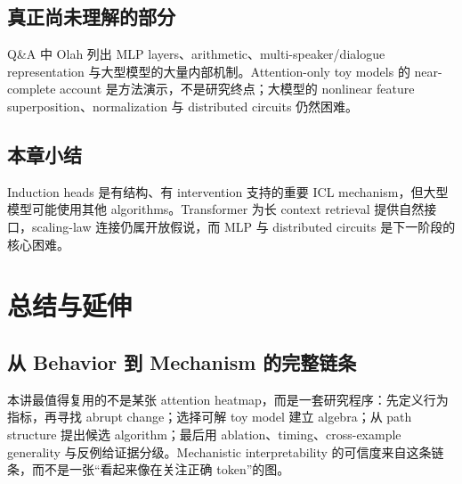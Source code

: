 \documentclass[a4paper]{article}
\begin{document}

\subsection{真正尚未理解的部分}

Q\&A 中 Olah 列出 MLP layers、arithmetic、multi-speaker/dialogue representation 与大型模型的大量内部机制。Attention-only toy models 的 near-complete account 是方法演示，不是研究终点；大模型的 nonlinear feature superposition、normalization 与 distributed circuits 仍然困难。


\subsection{本章小结}

Induction heads 是有结构、有 intervention 支持的重要 ICL mechanism，但大型模型可能使用其他 algorithms。Transformer 为长 context retrieval 提供自然接口，scaling-law 连接仍属开放假说，而 MLP 与 distributed circuits 是下一阶段的核心困难。

\section{总结与延伸}

\subsection{从 Behavior 到 Mechanism 的完整链条}

本讲最值得复用的不是某张 attention heatmap，而是一套研究程序：先定义行为指标，再寻找 abrupt change；选择可解 toy model 建立 algebra；从 path structure 提出候选 algorithm；最后用 ablation、timing、cross-example generality 与反例给证据分级。Mechanistic interpretability 的可信度来自这条链条，而不是一张“看起来像在关注正确 token”的图。
\end{document}
